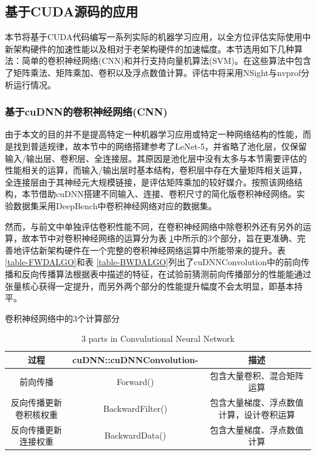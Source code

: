 \subsection{基于CUDA源码的应用}
\par 本节将基于CUDA代码编写一系列实际的机器学习应用，以全方位评估实际使用中新架构硬件的加速性能以及相对于老架构硬件的加速幅度。本节选用如下几种算法：简单的卷积神经网络(CNN)和并行支持向量机算法(SVM)。在这些算法中包含了矩阵乘法、矩阵乘加、卷积以及浮点数值计算。评估中将采用NSight与nvprof分析运行情况。
\subsubsection{基于cuDNN的卷积神经网络(CNN)}
\par 由于本文的目的并不是提高特定一种机器学习应用或特定一种网络结构的性能，而是找到普适规律，故本节中的网络搭建参考了LeNet-5，并省略了池化层，仅保留输入/输出层、卷积层、全连接层。其原因是池化层中没有太多与本节需要评估的性能相关的运算，而输入/输出层时基本结构，卷积层中存在大量矩阵相关运算，全连接层由于其神经元大规模链接，是评估矩阵乘加的较好媒介。按照该网络结构，本节借助cuDNN搭建不同输入、连接、卷积尺寸的简化版卷积神经网络。实验数据集采用DeepBench中卷积神经网络对应的数据集。
\par 然而，与前文中单独评估卷积性能不同，在卷积神经网络中除卷积外还有另外的运算，故本节中对卷积神经网络的运算分为表 \ref{table-CONVSTEP}中所示的3个部分，旨在更准确、完善地评估新架构硬件在一个完整的卷积神经网络运算中所能带来的提升。表 \ref{table-FWDALGO}和表 \ref{table-BWDALGO}列出了cuDNNConvolution中的前向传播和反向传播算法根据表中描述的特征，在试验前猜测前向传播部分的性能能通过张量核心获得一定提升，而另外两个部分的性能提升幅度不会太明显，即基本持平。
\begin{table}
	\centering
	\renewcommand{\thetable}{\arabic{section}-\arabic{table} }
	\renewcommand{\tablename}{表}
	\caption{卷积神经网络中的3个计算部分}
	\addtocounter{table}{-1}
	\renewcommand{\thetable}{\arabic{section}-\arabic{table} }
	\renewcommand{\tablename}{Table}
	\caption{3 parts in Convulutional Neural Network}
	\begin{tabular}{ccc}
		\toprule
		过程 & cuDNN::cuDNNConvolution-	&	描述\\
		\midrule
		前向传播 & Forward() & 包含大量卷积、混合矩阵运算 \\
		反向传播更新卷积核权重 & BackwardFilter() & 包含大量梯度、浮点数值计算，设计卷积运算\\
		反向传播更新连接权重 & BackwardData() & 包含大量梯度、浮点数值计算\\
		\bottomrule
	\end{tabular} \label{table-CONVSTEP} 
\end{table}
